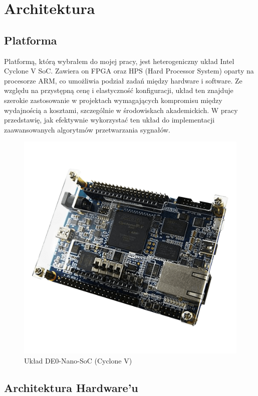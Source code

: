 \chapter{Architektura}
\label{cha:architektura}

\section{Platforma}
\label{sec:platforma}
Platformą, którą wybrałem do mojej pracy, jest heterogeniczny układ Intel Cyclone V SoC.
Zawiera on FPGA oraz HPS (Hard Processor System) oparty na procesorze ARM, co umożliwia
podział zadań między hardware i software. Ze względu na przystępną cenę i elastyczność konfiguracji,
układ ten znajduje szerokie zastosowanie w projektach wymagających kompromisu między wydajnością a kosztami,
szczególnie w środowiskach akademickich. W pracy przedstawię, jak efektywnie wykorzystać ten układ do implementacji zaawansowanych algorytmów przetwarzania sygnałów.

\begin{figure}[!htb]
    \centerline{\includegraphics[scale=0.2]{de0-nano-soc.png}}
    \caption{Układ DE0-Nano-SoC (Cyclone V)}
    \label{fig:de0-nano-soc}
\end{figure}

\newpage
\section{Architektura Hardware'u}
\label{sec:architektura-hw}

